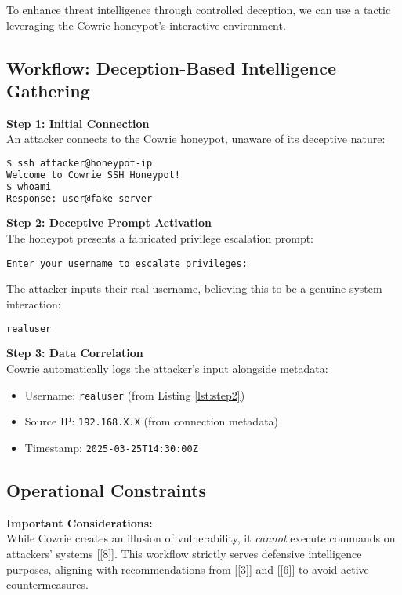 \documentclass{article}
\begin{document}
\begin{tcolorbox}[
    colback=blue!5!white, 
    colframe=black!75!black, 
    title={Deception Tactic Workflow}, 
    fonttitle=\bfseries\large\centering,
    arc=4mm,                  
    boxrule=1pt,              
    left=10pt, right=10pt,    
    top=10pt, bottom=10pt,    
    enhanced
]
\noindent To enhance threat intelligence through controlled deception, we can use a tactic leveraging the Cowrie honeypot's interactive environment.

\subsection*{Workflow: Deception-Based Intelligence Gathering}

\noindent \textbf{Step 1: Initial Connection} \\
An attacker connects to the Cowrie honeypot, unaware of its deceptive nature:
\begin{lstlisting}[language=bash, caption={Attacker Session Initiation}, label={lst:step1}]
$ ssh attacker@honeypot-ip
Welcome to Cowrie SSH Honeypot!
$ whoami
Response: user@fake-server
\end{lstlisting}

\noindent \textbf{Step 2: Deceptive Prompt Activation} \\
The honeypot presents a fabricated privilege escalation prompt:
\begin{lstlisting}
Enter your username to escalate privileges:
\end{lstlisting}
The attacker inputs their real username, believing this to be a genuine system interaction:
\begin{lstlisting}[language=bash, caption={Attacker Credential Disclosure}, label={lst:step2}]
realuser
\end{lstlisting}

\noindent \textbf{Step 3: Data Correlation} \\
Cowrie automatically logs the attacker's input alongside metadata:
\begin{itemize}
    \item Username: \texttt{realuser} (from Listing \ref{lst:step2})
    \item Source IP: \texttt{192.168.X.X} (from connection metadata)
    \item Timestamp: \texttt{2025-03-25T14:30:00Z}
\end{itemize}

\subsection*{Operational Constraints}
\begin{mdframed}[backgroundcolor=yellow!10, linewidth=1pt]
\noindent \textbf{Important Considerations:} \\
While Cowrie creates an illusion of vulnerability, it \emph{cannot} execute commands on attackers' systems [[8]]. This workflow strictly serves defensive intelligence purposes, aligning with recommendations from [[3]] and [[6]] to avoid active countermeasures.
\end{mdframed}
\end{tcolorbox}
\end{document}
